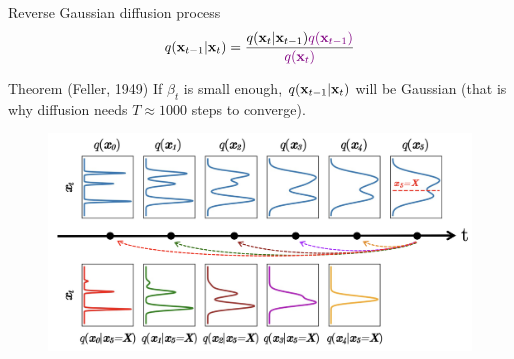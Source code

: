\begin{frame}{Reverse Gaussian diffusion process}
		\vspace{-0.4cm}
		\[
			q(\mathbf{x}_{t-1}|\mathbf{x}_{t}) = \frac{q(\mathbf{x}_{t}|\mathbf{x}_{t-1}) {\color{violet}q(\mathbf{x}_{t-1})}}{{\color{violet}q(\mathbf{x}_{t})}} 
		\]
		\vspace{-0.4cm}
		\begin{block}{Theorem (Feller, 1949)}
			If $\beta_t$ is small enough, $q(\mathbf{x}_{t-1}|\mathbf{x}_{t})$ will be Gaussian {\color{gray}(that is why diffusion needs $T \approx 1000$ steps to converge)}.
		\end{block}
		\vspace{-0.3cm}
		\begin{figure}
			\includegraphics[width=0.7\linewidth]{figs/inverse_distr_1d}
		\end{figure}
	\end{frame} 
